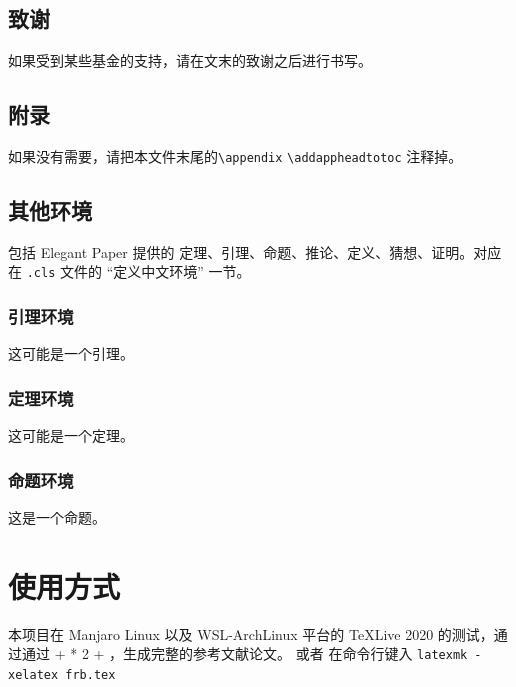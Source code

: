 \documentclass[lang=cn,12pt]{frbpaper}
\begin{document}
\subsection{致谢}

如果受到某些基金的支持，请在文末的致谢之后进行书写。

\subsection{附录}

如果没有需要，请把本文件末尾的\lstinline{\appendix} \lstinline{\addappheadtotoc} 注释掉。

\subsection{其他环境}

包括 Elegant Paper 提供的 定理、引理、命题、推论、定义、猜想、证明。对应在 \lstinline{.cls} 文件的 “定义中文环境” 一节。

\subsubsection{引理环境}


\begin{lemma}[一个引理]
    这可能是一个引理。
\end{lemma}


\subsubsection{定理环境}

\begin{theorem}[一个定理]
    这可能是一个定理。
\end{theorem}

\subsubsection{命题环境}

\begin{proposition}[一个命题]
    这是一个命题。
\end{proposition}

\section{使用方式}

本项目在 Manjaro Linux 以及 WSL-ArchLinux 平台的 TeXLive 2020 的测试，通过通过  +  * 2 + ，生成完整的参考文献论文。
或者 在命令行键入 \lstinline{latexmk -xelatex frb.tex}
\end{document}
